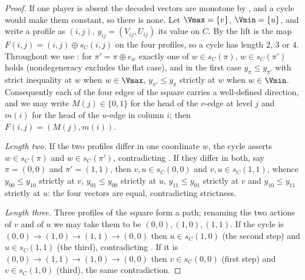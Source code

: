 \begin{proof}
If one player is absent the decoded vectors are monotone by
, and a cycle would make them constant, so there is
none. Let $\Vmax=\{v\}$, $\Vmin=\{u\}$, and write a profile as
$(i,j)$, $y_{ij}=(V_{ij},U_{ij})$ its value on $C$. By
 the lift is the map $F(i,j)=(i,j)\oplus s_C(i,j)$ on
the four profiles, so a cycle has length $2$, $3$ or $4$. Throughout we use
: for $\pi'=\pi\oplus e_w$ exactly one of
$w\in s_C(\pi)$, $w\in s_C(\pi')$ holds (nondegeneracy excludes the flat
case), and in the first case $y_\pi\le y_{\pi'}$ with strict inequality at
$w$ when $w\in\Vmax$, $y_{\pi'}\le y_\pi$ strictly at $w$ when $w\in\Vmin$.
Consequently each of the four edges of the square carries a well-defined
direction, and we may write $M(j)\in\{0,1\}$ for the head of the $v$-edge
at level $j$ and $m(i)$ for the head of the $u$-edge in column $i$; then
$F(i,j)=(M(j),m(i))$.

\emph{Length two.} If the two profiles differ in one coordinate $w$, the
cycle asserts $w\in s_C(\pi)$ and $w\in s_C(\pi')$, contradicting
. If they differ in both, say
$\pi=(0,0)$ and $\pi'=(1,1)$, then $v,u\in s_C(0,0)$ and $v,u\in s_C(1,1)$,
whence $y_{00}\le y_{10}$ strictly at $v$, $y_{01}\le y_{00}$ strictly at
$u$, $y_{11}\le y_{01}$ strictly at $v$ and $y_{10}\le y_{11}$ strictly at
$u$: the four vectors are equal, contradicting strictness.

\emph{Length three.} Three profiles of the square form a path; renaming the
two actions of $v$ and of $u$ we may take them to be $(0,0),(1,0),(1,1)$.
If the cycle is $(0,0)\to(1,0)\to(1,1)\to(0,0)$ then $u\in s_C(1,0)$ (the
second step) and $u\in s_C(1,1)$ (the third), contradicting
. If it is $(0,0)\to(1,1)\to(1,0)\to(0,0)$
then $v\in s_C(0,0)$ (first step) and $v\in s_C(1,0)$ (third), the same
contradiction.


\end{proof}
